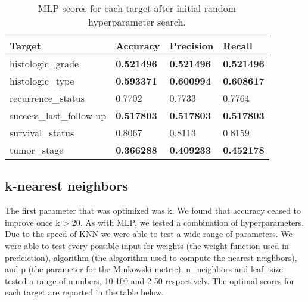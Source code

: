 \documentclass{article}
\begin{document}
\medskip
\begin{table}[H]
\begin{center}
\begin{tabular}{ *{4}{l} }
    \multicolumn{1}{p{1.5cm}}{\raggedright Target} &  
    \multicolumn{1}{p{1.5cm}}{\raggedright Accuracy} &  
    \multicolumn{1}{p{1.5cm}}{\raggedright Precision} &  
    \multicolumn{1}{p{1.5cm}}{\raggedright Recall} \\ \hline
histologic\_grade       &       \textbf{0.521496} &        \textbf{0.521496} &     \textbf{0.521496} \\
histologic\_type        &       \textbf{0.593371} &        \textbf{0.600994} &     \textbf{0.608617} \\
recurrence\_status      &         0.7702 &          0.7733 &       0.7764 \\
success\_last\_follow-up &       \textbf{0.517803} &        \textbf{0.517803} &     \textbf{0.517803} \\
survival\_status        &         0.8067 &          0.8113 &       0.8159 \\
tumor\_stage            &       \textbf{0.366288} &        \textbf{0.409233} &     \textbf{0.452178} \\
\end{tabular}
\caption{MLP scores for each target after initial random hyperparameter search.}
\end{center}
\end{table}

\subsection{k-nearest neighbors}

The first parameter that was optimized was k. We found that accuracy ceased to improve once k > 20. 
As with MLP, we tested a combination of hyperparameters. 
Due to the speed of KNN we were able to test a wide range of parameters. We were able to test every possible input for weights (the weight function used in predeiction), algorithm (the alsgorithm used to compute the nearest neighbors), and p (the parameter for the Minkowski metric). 
n\_neighbors and leaf\_size tested a range of numbers, 10-100 and 2-50 respectively.
The optimal scores for each target are reported in the table below.
\end{document}
